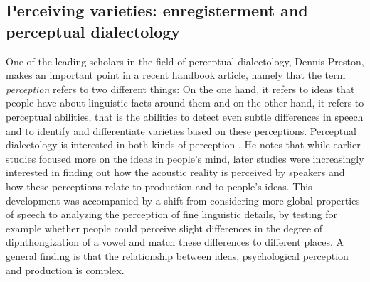 \subsection{Perceiving varieties: enregisterment and perceptual dialectology}
\label{bkm:Ref10466352}\hypertarget{Toc63021213}{}
One of the leading scholars in the field of perceptual dialectology, Dennis Preston, makes an important point in a recent handbook article, namely that the term \textit{perception} refers to two different things: On the one hand, it refers to ideas that people have about linguistic facts around them and on the other hand, it refers to perceptual abilities, that is the abilities to detect even subtle differences in speech and to identify and differentiate varieties based on these perceptions. Perceptual dialectology is interested in both kinds of perception \citep[199]{Preston2018}. He notes that while earlier studies focused more on the ideas in people’s mind, later studies were increasingly interested in finding out how the acoustic reality is perceived by speakers and how these perceptions relate to production and to people’s ideas. This development was accompanied by a shift from considering more global properties of speech to analyzing the perception of fine linguistic details, by testing for example whether people could perceive slight differences in the degree of diphthongization of a vowel and match these differences to different places. A general finding is that the relationship between ideas, psychological perception and production is complex.


